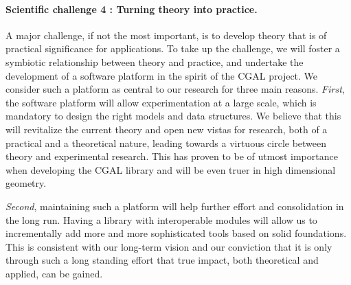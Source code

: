 


\paragraph{Scientific challenge 4 : Turning theory into practice.}%
A major challenge, if not the most important, is to develop theory that is of practical significance for applications.   To take up the challenge, we will foster a symbiotic relationship between theory and practice, and  undertake the development of a software platform in the spirit of the CGAL project. We consider such a platform as central to our research  for three main reasons.  {\em First}, the software platform will allow experimentation at a large scale, which is mandatory to design the right models and data structures. We believe that this will revitalize the current theory and open new vistas for research, both of a practical and a theoretical nature, leading towards a virtuous circle between theory and experimental research. This has proven to be of utmost importance when developing the CGAL library and will be even truer in high dimensional geometry.

{\em Second}, maintaining such a platform will help further effort and consolidation in the long run.  Having a library with interoperable modules will allow us to incrementally add more and more sophisticated tools based on solid foundations.  This is consistent with our long-term vision and our conviction that it is only through such a long standing effort that true impact, both theoretical and applied, can be gained.

